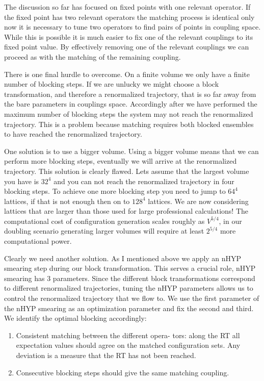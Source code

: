 The discussion so far has focused on fixed points with one relevant operator.
If the fixed point has two relevant operators the matching process is identical only now it is necessary to tune two operators to find pairs of points in coupling space.
While this is possible it is much easier to fix one of the relevant couplings to its fixed point value.
By effectively removing one of the relevant couplings we can proceed as with the matching of the remaining coupling.

There is one final hurdle to overcome.
On a finite volume we only have a finite number of blocking steps.
If we are unlucky we might choose a block transformation, and therefore a renormalized trajectory, that is so far away from the bare parameters in couplings space.
Accordingly after we have performed the maximum number of blocking steps the system may not reach the renormalized trajectory.
This is a problem because matching requires both blocked ensembles to have reached the renormalized trajectory.

One solution is to use a bigger volume.
Using a bigger volume means that we can perform more blocking steps, eventually we will arrive at the renormalized trajectory.
This solution is clearly flawed.
Lets assume that the largest volume you have is $32^4$ and you can not reach the renormalized trajectory in four blocking steps.
To achieve one more blocking step you need to jump to $64^4$ lattices, if that is not enough then on to $128^4$ lattices.
We are now considering lattices that are larger than those used for large professional calculations!
The computational cost of configuration generation scales roughly as $V^{5/4}$, in our doubling scenario generating larger volumes will require at least $2^{5/4}$ more computational power.

Clearly we need another solution.
As I mentioned above we apply an nHYP smearing step during our block transformation.
This serves a crucial role, nHYP smearing has 3 parameters.
Since the different block transformations correspond to different renormalized trajectories, tuning the nHYP parameters allows us to control the renormalized trajectory that we flow to.
We use the first parameter of the nHYP smearing as an optimization parameter and fix the second and third.
We identify the optimal blocking accordingly:
\begin{enumerate}
  \item Consistent matching between the different opera- tors: along the RT all expectation values should agree on the matched configuration sets. Any deviation is a measure that the RT has not been reached.
  \item Consecutive blocking steps should give the same matching coupling.
\end{enumerate}

